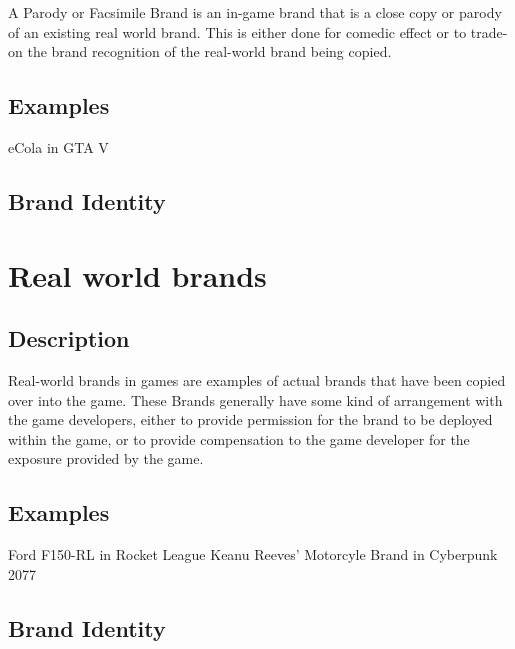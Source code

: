 A Parody or Facsimile Brand is an in-game brand that is a close copy or parody of an existing real world brand. This is either done for comedic effect or to trade-on the brand recognition of the real-world brand being copied.

\subsection{Examples}

eCola in GTA V
\subsection{Brand Identity}

\section{Real world brands }

\subsection{Description}

Real-world brands in games are examples of actual brands that have been copied over into the game. These Brands generally have some kind of arrangement with the game developers, either to provide permission for the brand to be deployed within the game, or to provide compensation to the game developer for the exposure provided by the game.

\subsection{Examples}
Ford F150-RL in Rocket League
Keanu Reeves' Motorcyle Brand in Cyberpunk 2077
\subsection{Brand Identity}